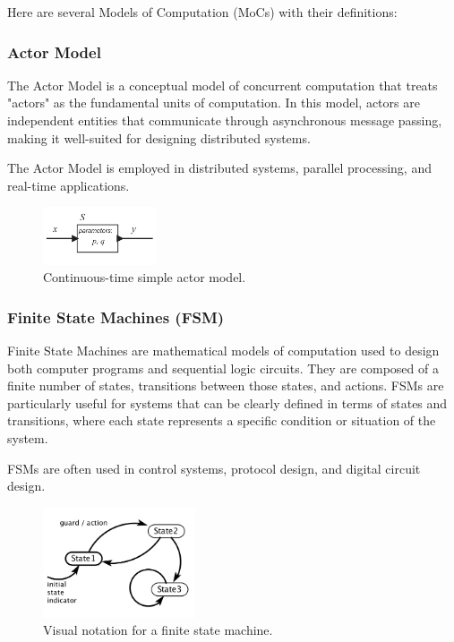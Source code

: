 \documentclass[12pt	]{article}
\begin{document}
Here are several Models of Computation (MoCs) with their definitions:








\subsubsection{Actor Model}
The Actor Model is a conceptual model of concurrent computation that treats "actors" as the fundamental units of computation. In this model, actors are independent entities that communicate through asynchronous message passing, making it well-suited for designing distributed systems.

The Actor Model is employed in distributed systems, parallel processing, and real-time applications.
\begin{figure}[h]
	\centering
	\includegraphics[width=0.3\textwidth]{Images/img3.png}
	\caption{Continuous-time simple actor model.}
	\label{fig:Continuous-time Simple Actor Model}
\end{figure}








\subsubsection{Finite State Machines (FSM)}
Finite State Machines are mathematical models of computation used to design both computer programs and sequential logic circuits. They are composed of a finite number of states, transitions between those states, and actions. FSMs are particularly useful for systems that can be clearly defined in terms of states and transitions, where each state represents a specific condition or situation of the system.

FSMs are often used in control systems, protocol design, and digital circuit design.

\begin{figure}[h]
	\centering
	\includegraphics[width=0.4\textwidth]{Images/img1.png}
	\caption{Visual notation for a finite state machine.}
	\label{fig:Visual notation for a finite state machine}
\end{figure}
\end{document}
